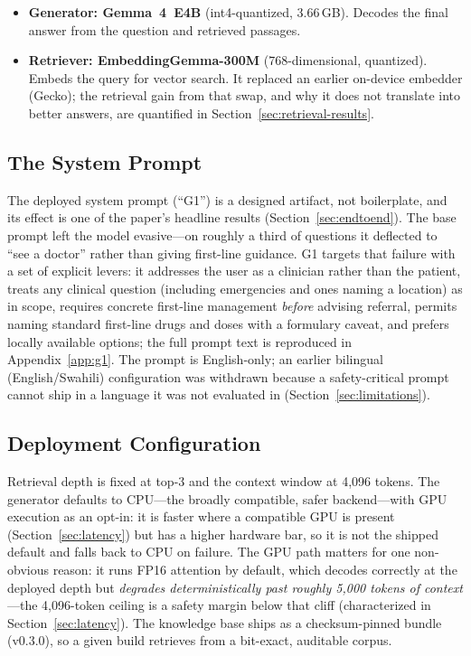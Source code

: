 \begin{itemize}
  \item \textbf{Generator: Gemma~4~E4B} (int4-quantized, 3.66\,GB). Decodes
  the final answer from the question and retrieved passages.
  \item \textbf{Retriever: EmbeddingGemma-300M} (768-dimensional, quantized).
  Embeds the query for vector search. It replaced an earlier on-device
  embedder (Gecko); the retrieval gain from that swap, and why it does not
  translate into better answers, are quantified in
  Section~\ref{sec:retrieval-results}.
\end{itemize}

\subsection{The System Prompt}
\label{sec:system-prompt}

The deployed system prompt (``G1'') is a designed artifact, not boilerplate,
and its effect is one of the paper's headline results
(Section~\ref{sec:endtoend}). The base prompt left the model evasive---on
roughly a third of questions it deflected to ``see a doctor'' rather than
giving first-line guidance. G1 targets that failure with a set of explicit
levers: it addresses the user as a clinician rather than the patient, treats
any clinical question (including emergencies and ones naming a location) as
in scope, requires concrete first-line management \emph{before} advising
referral, permits naming standard first-line drugs and doses with a
formulary caveat, and prefers locally available options; the full prompt text
is reproduced in Appendix~\ref{app:g1}. The prompt is
English-only; an earlier bilingual (English/Swahili) configuration was
withdrawn because a safety-critical prompt cannot ship in a language it was
not evaluated in (Section~\ref{sec:limitations}).

\subsection{Deployment Configuration}

Retrieval depth is fixed at top-3 and the context window at 4{,}096 tokens.
The generator defaults to CPU---the broadly compatible, safer backend---with
GPU execution as an opt-in: it is faster where a compatible GPU is present
(Section~\ref{sec:latency}) but has a higher hardware bar, so it is not the shipped
default and falls back to CPU on failure. The GPU path matters for one non-obvious reason: it
runs FP16 attention by default, which decodes correctly at the deployed
depth but \emph{degrades deterministically past roughly 5{,}000 tokens of
context}---the 4{,}096-token ceiling is a safety margin below that cliff
(characterized in Section~\ref{sec:latency}). The knowledge base ships as a
checksum-pinned bundle (v0.3.0), so a given build retrieves from a bit-exact,
auditable corpus.

